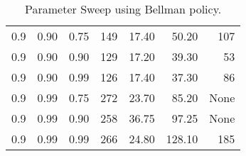 \begin{table}[h]
\begin{tabular}{r l r | r r r r}
			0.9 & 0.90 & 0.75 & 149  & 17.40 &  50.20 &  107 \\
			0.9 & 0.90 & 0.90 & 129  & 17.20 &  39.30 &   53 \\
			0.9 & 0.90 & 0.99 & 126  & 17.40 &  37.30 &   86 \\
			0.9 & 0.99 & 0.75 & 272  & 23.70 &  85.20 & None \\
			0.9 & 0.99 & 0.90 & 258  & 36.75 &  97.25 & None \\
			0.9 & 0.99 & 0.99 & 266  & 24.80 & 128.10 &  185 \\
		\bottomrule
	\end{tabular}
	\caption{Parameter Sweep using Bellman policy.}
\end{table}


